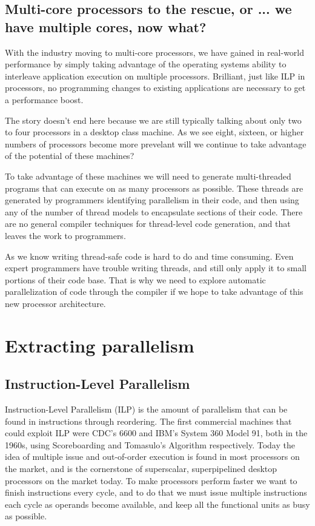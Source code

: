 \documentclass[12pt,twoside,letterpaper]{article}
\begin{document}
\subsection*{Multi-core processors to the rescue, or ... we have multiple cores, now what?}
With the industry moving to multi-core processors, we have gained in real-world performance by simply taking advantage of the operating systems ability to interleave application execution on multiple processors. Brilliant, just like ILP in processors, no programming changes to existing applications are necessary to get a performance boost.

The story doesn't end here because we are still typically talking about only two to four processors in a desktop class machine. As we see eight, sixteen, or higher numbers of processors become more prevelant will we continue to take advantage of the potential of these machines?

To take advantage of these machines we will need to generate multi-threaded programs that can execute on as many processors as possible. These threads are generated by programmers identifying parallelism in their code, and then using any of the number of thread models to encapsulate sections of their code. There are no general compiler techniques for thread-level code generation, and that leaves the work to programmers.

As we know writing thread-safe code is hard to do and time consuming. Even expert programmers have trouble writing threads, and still only apply it to small portions of their code base. That is why we need to explore automatic parallelization of code through the compiler if we hope to take advantage of this new processor architecture.

\section*{Extracting parallelism}
\subsection*{Instruction-Level Parallelism}
Instruction-Level Parallelism (ILP) is the amount of parallelism that can be found in instructions through reordering. The first commercial machines that could exploit ILP were CDC’s 6600 and IBM’s System 360 Model 91, both in the 1960s, using Scoreboarding and Tomasulo’s Algorithm respectively. Today the idea of multiple issue and out-of-order execution is found in most processors on the market, and is the cornerstone of superscalar, superpipelined desktop processors on the market today. To make processors perform faster we want to finish instructions every cycle, and to do that we must issue multiple instructions each cycle as operands become available, and keep all the functional units as busy as possible.
\end{document}
